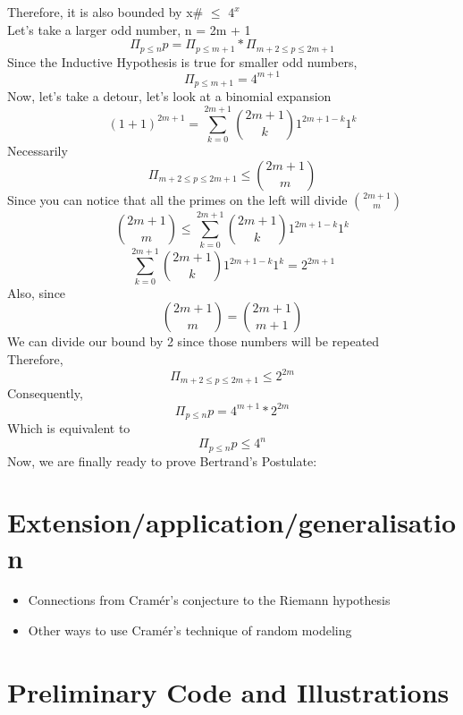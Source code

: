 \documentclass[conference]{IEEEtran}
\begin{document}
Therefore, it is also bounded by x\# $\leq$ $4^x$\\
Let's take a larger odd number, n = 2m + 1
\[
    \Pi_{p \leq n}p = \Pi_{p\leq m + 1} * \Pi_{m + 2 \leq p \leq 2m + 1}
\]
Since the Inductive Hypothesis is true for smaller odd numbers,
\[
    \Pi_{p\leq m + 1} = 4^{m + 1}
\]
Now, let's take a detour, let's look at a binomial expansion
\[
    (1 + 1)^{2m + 1} = \sum^{2m + 1}_{k = 0}{\binom{2m + 1}{k}}1^{2m + 1 - k}{1^{k}}
\]
Necessarily 
\[
    \Pi_{m + 2 \leq p \leq 2m + 1} \leq {\binom{2m + 1}{m}}
\]
Since you can notice that all the primes on the left will divide $\binom{2m+1}{m}$
\[
    \binom{2m + 1}{m} \leq \sum^{2m + 1}_{k = 0}{\binom{2m + 1}{k}}1^{2m + 1 - k}{1^{k}}
\]
\[
    \sum^{2m + 1}_{k = 0}{\binom{2m+1}{k}}1^{2m + 1 - k}{1^{k}} = 2^{2m + 1}
\]
Also, since 
\[
    {\binom{2m+1}{m}} = {\binom{2m+1}{m+1}}
\]
We can divide our bound by 2 since those numbers will be repeated\\
Therefore,
\[
    \Pi_{m + 2 \leq p \leq 2m + 1} \leq 2^{2m}
\]
Consequently,
\[
     \Pi_{p \leq n}p = 4^{m + 1} * 2^{2m}
\]
Which is equivalent to
\[
    \Pi_{p \leq n}p \leq 4^{n}
\]
Now, we are finally ready to prove Bertrand's Postulate:

\section{Extension/application/generalisation}
\begin{itemize}
    \item Connections from Cram\'er's conjecture to the Riemann hypothesis
    \item Other ways to use Cram\'er's technique of random modeling
\end{itemize}


\section{Preliminary Code and Illustrations}
\end{document}
